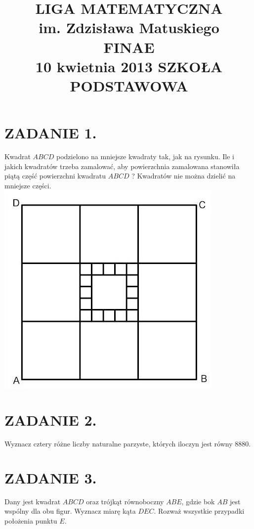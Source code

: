 \documentclass[10pt]{article}
\title{LIGA MATEMATYCZNA \\
 im. Zdzisława Matuskiego \\
 FINAE \\
 10 kwietnia 2013 SZKOŁA PODSTAWOWA }
\author{}
\date{}
\begin{document}
\maketitle
\section*{ZADANIE 1.}
Kwadrat \(A B C D\) podzielono na mniejsze kwadraty tak, jak na rysunku. Ile i jakich kwadratów trzeba zamalować, aby powierzchnia zamalowana stanowiła piątą część powierzchni kwadratu \(A B C D\) ? Kwadratów nie można dzielić na mniejsze części.\\
\includegraphics[max width=\textwidth, center]{2024_11_21_8651a206313a84caad96g-1}

\section*{ZADANIE 2.}
Wyznacz cztery różne liczby naturalne parzyste, których iloczyn jest równy 8880.

\section*{ZADANIE 3.}
Dany jest kwadrat \(A B C D\) oraz trójkąt równoboczny \(A B E\), gdzie bok \(A B\) jest wspólny dla obu figur. Wyznacz miarę kąta \(D E C\). Rozważ wszystkie przypadki położenia punktu \(E\).
\end{document}
